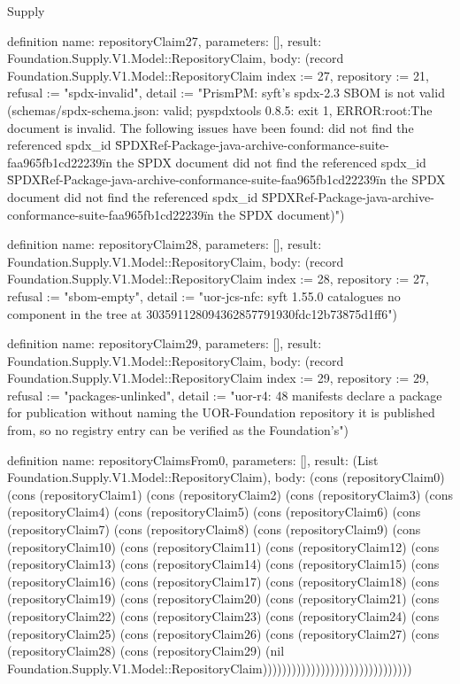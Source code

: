 \begin{lexlean}{Supply}
\begin{semanticmodule}
definition{
  name: repositoryClaim27,
  parameters: [],
  result: Foundation.Supply.V1.Model::RepositoryClaim,
  body: (record Foundation.Supply.V1.Model::RepositoryClaim {index := 27, repository := 21, refusal := "spdx-invalid", detail := "PrismPM: syft's spdx-2.3 SBOM is not valid (schemas/spdx-schema.json: valid; pyspdxtools 0.8.5: exit 1, ERROR:root:The document is invalid. The following issues have been found: did not find the referenced spdx_id \"SPDXRef-Package-java-archive-conformance-suite-faa965fb1cd22239\" in the SPDX document did not find the referenced spdx_id \"SPDXRef-Package-java-archive-conformance-suite-faa965fb1cd22239\" in the SPDX document did not find the referenced spdx_id \"SPDXRef-Package-java-archive-conformance-suite-faa965fb1cd22239\" in the SPDX document)"})
}

definition{
  name: repositoryClaim28,
  parameters: [],
  result: Foundation.Supply.V1.Model::RepositoryClaim,
  body: (record Foundation.Supply.V1.Model::RepositoryClaim {index := 28, repository := 27, refusal := "sbom-empty", detail := "uor-jcs-nfc: syft 1.55.0 catalogues no component in the tree at 303591128094362857791930fdc12b73875d1ff6"})
}

definition{
  name: repositoryClaim29,
  parameters: [],
  result: Foundation.Supply.V1.Model::RepositoryClaim,
  body: (record Foundation.Supply.V1.Model::RepositoryClaim {index := 29, repository := 29, refusal := "packages-unlinked", detail := "uor-r4: 48 manifests declare a package for publication without naming the UOR-Foundation repository it is published from, so no registry entry can be verified as the Foundation's"})
}

definition{
  name: repositoryClaimsFrom0,
  parameters: [],
  result: (List Foundation.Supply.V1.Model::RepositoryClaim),
  body: (cons (repositoryClaim0) (cons (repositoryClaim1) (cons (repositoryClaim2) (cons (repositoryClaim3) (cons (repositoryClaim4) (cons (repositoryClaim5) (cons (repositoryClaim6) (cons (repositoryClaim7) (cons (repositoryClaim8) (cons (repositoryClaim9) (cons (repositoryClaim10) (cons (repositoryClaim11) (cons (repositoryClaim12) (cons (repositoryClaim13) (cons (repositoryClaim14) (cons (repositoryClaim15) (cons (repositoryClaim16) (cons (repositoryClaim17) (cons (repositoryClaim18) (cons (repositoryClaim19) (cons (repositoryClaim20) (cons (repositoryClaim21) (cons (repositoryClaim22) (cons (repositoryClaim23) (cons (repositoryClaim24) (cons (repositoryClaim25) (cons (repositoryClaim26) (cons (repositoryClaim27) (cons (repositoryClaim28) (cons (repositoryClaim29) (nil Foundation.Supply.V1.Model::RepositoryClaim)))))))))))))))))))))))))))))))
}


\end{semanticmodule}
\end{lexlean}
